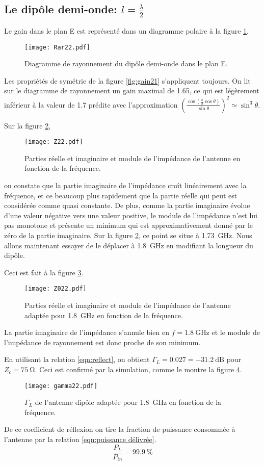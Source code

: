 \subsection{Le dipôle demi-onde: $l = \frac{\lambda}{2}$}
Le gain dans le plan E est représenté dans un diagramme polaire à la figure \ref{fig:gain22}.
\begin{figure}[htbp]
  \centering
  \texttt{[image: Rar22.pdf]}
  \caption{Diagramme de rayonnement du dipôle demi-onde dans le plan E.\label{fig:gain22}}
\end{figure}
Les propriétés de symétrie de la figure \ref{fig:gain21} s'appliquent toujours. On lit sur le diagramme de rayonnement un gain maximal de \num{1.65}, ce qui est légèrement inférieur à la valeur de \num{1.7} prédite avec l'approximation $\left ( \frac{\cos(\frac{\pi}{2}\cos\theta)}{\sin\theta} \right ) ^2 \simeq \sin^3 \theta$.

Sur la figure \ref{fig:Z22},
\begin{figure}[htbp]
  \centering
  \texttt{[image: Z22.pdf]}
  \caption{Parties réelle et imaginaire et module de l'impédance de l'antenne en fonction de la fréquence.\label{fig:Z22}}
\end{figure}
on constate que la partie imaginaire de l'impédance croît linéairement avec la fréquence, et ce beaucoup plus rapidement que la partie réelle qui peut est considérée comme quasi constante. De plus, comme la partie imaginaire évolue d'une valeur négative vers une valeur positive, le module de l'impédance n'est lui pas monotone et présente un minimum qui est approximativement donné par le zéro de la partie imaginaire. Sur la figure \ref{fig:Z22}, ce point se situe à \SI{1.73}{\giga\hertz}. Nous allons maintenant essayer de le déplacer à \SI{1.8}{\giga\hertz} en modifiant la longueur du dipôle.

Ceci est fait à la figure \ref{fig:Z022}.
\begin{figure}[htbp]
  \centering
  \texttt{[image: Z022.pdf]}
  \caption{Parties réelle et imaginaire et module de l'impédance de l'antenne adaptée pour \SI{1.8}{\giga\hertz} en fonction de la fréquence.\label{fig:Z022}}
\end{figure}
La partie imaginaire de l'impédance s'annule bien en $f = \SI{1.8}{\giga\hertz}$ et le module de l'impédance de rayonnement est donc proche de son minimum.

En utilisant la relation \ref{eqn:reflect}, on obtient $\Gamma_L = 0.027 = \SI{-31.2}{\deci\bel}$ pour $Z_c = \SI{75}{\ohm}$. Ceci est confirmé par la simulation, comme le montre la figure \ref{fig:gamma22}.
\begin{figure}[htbp]
  \centering
  \texttt{[image: gamma22.pdf]}
  \caption{$\Gamma_L$ de l'antenne dipôle adaptée pour \SI{1.8}{\giga\hertz} en fonction de la fréquence.\label{fig:gamma22}}
\end{figure}
De ce coefficient de réflexion on tire la fraction de puissance consommée à l'antenne par la relation \ref{eqn:puissance délivrée}.
\[
  \frac{P_L}{P_{in}} = \SI{99.9}{\percent}
\]

